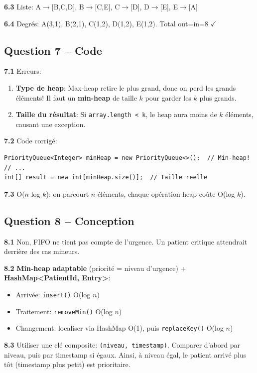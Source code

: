 \documentclass[11pt,letterpaper]{article}
\begin{document}
\textbf{6.3} Liste: A$\to$[B,C,D], B$\to$[C,E], C$\to$[D], D$\to$[E], E$\to$[A]

\textbf{6.4} Degrés: A(3,1), B(2,1), C(1,2), D(1,2), E(1,2). Total out=in=8 $\checkmark$

\subsection*{Question 7 -- Code}

\textbf{7.1} Erreurs:
\begin{enumerate}
    \item \textbf{Type de heap}: Max-heap retire le plus grand, donc on perd les grands éléments! Il faut un \textbf{min-heap} de taille $k$ pour garder les $k$ plus grands.
    \item \textbf{Taille du résultat}: Si \texttt{array.length < k}, le heap aura moins de $k$ éléments, causant une exception.
\end{enumerate}

\textbf{7.2} Code corrigé:
\begin{lstlisting}[style=java]
PriorityQueue<Integer> minHeap = new PriorityQueue<>();  // Min-heap!
// ...
int[] result = new int[minHeap.size()];  // Taille reelle
\end{lstlisting}

\textbf{7.3} O($n$ log $k$): on parcourt $n$ éléments, chaque opération heap coûte O(log $k$).

\subsection*{Question 8 -- Conception}

\textbf{8.1} Non, FIFO ne tient pas compte de l'urgence. Un patient critique attendrait derrière des cas mineurs.

\textbf{8.2} \textbf{Min-heap adaptable} (priorité = niveau d'urgence) + \textbf{HashMap<PatientId, Entry>}:
\begin{itemize}
    \item Arrivée: \texttt{insert()} O(log $n$)
    \item Traitement: \texttt{removeMin()} O(log $n$)
    \item Changement: localiser via HashMap O(1), puis \texttt{replaceKey()} O(log $n$)
\end{itemize}

\textbf{8.3} Utiliser une clé composite: \texttt{(niveau, timestamp)}. Comparer d'abord par niveau, puis par timestamp si égaux. Ainsi, à niveau égal, le patient arrivé plus tôt (timestamp plus petit) est prioritaire.
\end{document}
